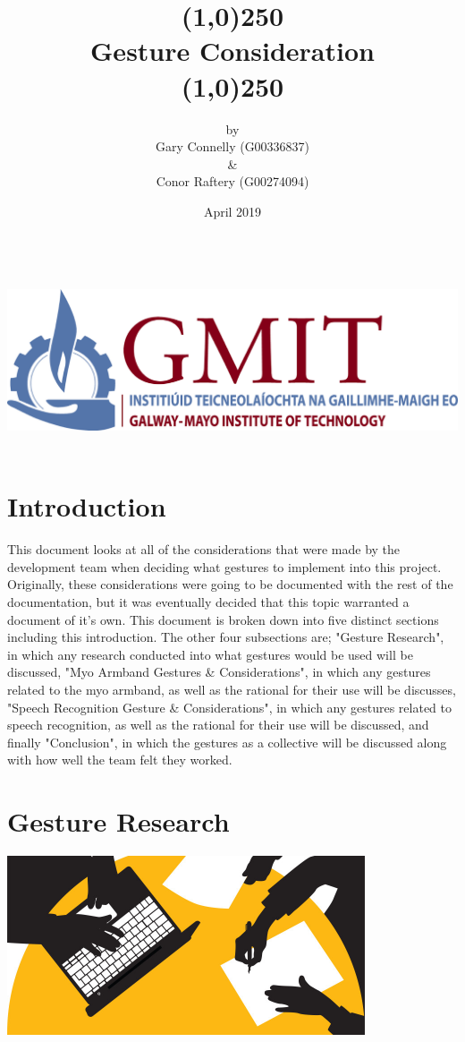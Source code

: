 \documentclass{article}
\title{\line(1,0){250}\\{\Huge \bigskip Gesture Consideration}\\\line(1,0){250}}
\author{ \footnotesize by \\[0.2cm] \footnotesize Gary Connelly (G00336837) \\[0.2cm] \footnotesize \& \\[0.2cm] \footnotesize Conor Raftery (G00274094)}
\date{\footnotesize April 2019}
\begin{document}
\maketitle
\bigskip
\bigskip
\bigskip
\bigskip
\bigskip
\bigskip
\bigskip
\bigskip
\bigskip
\bigskip
\bigskip
\bigskip
\includegraphics[width=\textwidth, height=150pt]{img/gmit-logo.jpg}
\clearpage

\tableofcontents
\clearpage

\section{Introduction}
This document looks at all of the considerations that were made by the development team when deciding what gestures to implement into this project. Originally, these considerations were going to be documented with the rest of the documentation, but it was eventually decided that this topic warranted a document of it's own. This document is broken down into five distinct sections including this introduction. The other four subsections are; "Gesture Research", in which any research conducted into what gestures would be used will be discussed, "Myo Armband Gestures \& Considerations", in which any gestures related to the myo armband, as well as the rational for their use will be discusses, "Speech Recognition Gesture \& Considerations", in which any gestures related to speech recognition, as well as the rational for their use will be discussed, and finally "Conclusion", in which the gestures as a collective will be discussed along with how well the team felt they worked. 

\clearpage

\section{Gesture Research}
\includegraphics[width=\textwidth, height=150pt]{img/Research.jpg}
\end{document}
